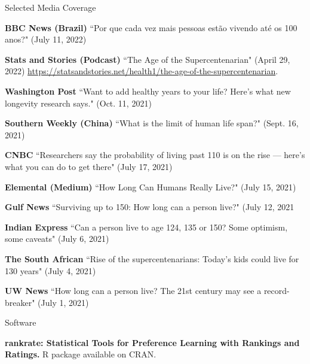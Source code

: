 \documentclass{resume} %
\begin{document}
\begin{rSection}{Selected Media Coverage}

\small{

{\bf BBC News (Brazil)} ``Por que cada vez mais pessoas est\~{a}o vivendo at\'{e} os 100 anos?" (July 11, 2022)

{\bf Stats and Stories (Podcast)} ``The Age of the Supercentenarian" (April 29, 2022) \url{https://statsandstories.net/health1/the-age-of-the-supercentenarian}.

{\bf Washington Post} ``Want to add healthy years to your life? Here’s what new longevity research says." (Oct. 11, 2021)

{\bf Southern Weekly (China)} ``What is the limit of human life span?" (Sept. 16, 2021)

{\bf CNBC} ``Researchers say the probability of living past 110 is on the rise — here’s what you can do to get there" (July 17, 2021)

{\bf Elemental (Medium)} ``How Long Can Humans Really Live?" (July 15, 2021)

{\bf Gulf News} ``Surviving up to 150: How long can a person live?" (July 12, 2021

{\bf Indian Express} ``Can a person live to age 124, 135 or 150? Some optimism, some caveats" (July 6, 2021)

{\bf The South African} ``Rise of the supercentenarians: Today’s kids could live for 130 years" (July 4, 2021)

{\bf UW News} ``How long can a person live? The 21st century may see a record-breaker" (July 1, 2021)
}

\end{rSection}




\begin{rSection}{Software}

{\bf rankrate: Statistical Tools for Preference Learning with Rankings and Ratings.} R package available on CRAN.

\end{rSection}
\end{document}
